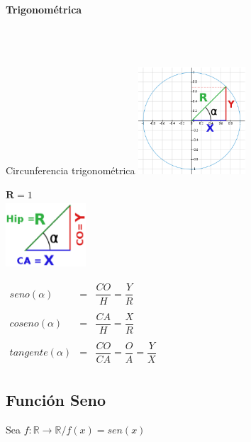 \paragraph{Trigonométrica}
\quad \\
\quad \\
\hfill
\begin{minipage}{.30\textwidth}
Circunferencia trigonométrica
\includegraphics[height=4cm,width=4cm]{ct.eps} 
\end{minipage}
\hfill
\begin{minipage}{.20\textwidth}
$\textbf{R}=1$\\
\includegraphics[height=2.5cm,width=3cm]{tt.eps} 

\end{minipage}
\hfill
\begin{minipage}{.40\textwidth}
\begin{center}
$
\begin{array}{ccc}

seno (\alpha) & = & \dfrac{CO}{H} = \dfrac{Y}{R} \\
\\
coseno (\alpha) & = & \dfrac{CA}{H} = \dfrac{X}{R} \\
\\
tangente (\alpha) & = & \dfrac{CO}{CA} = \dfrac{O}{A} = \dfrac{Y}{X} \\
\end{array}$\\
\end{center}
\end{minipage}
\hfill
\subsection{Función Seno}

Sea $f: \mathbb{R} \longrightarrow \mathbb{R} / f(x)= sen(x)$ \\


